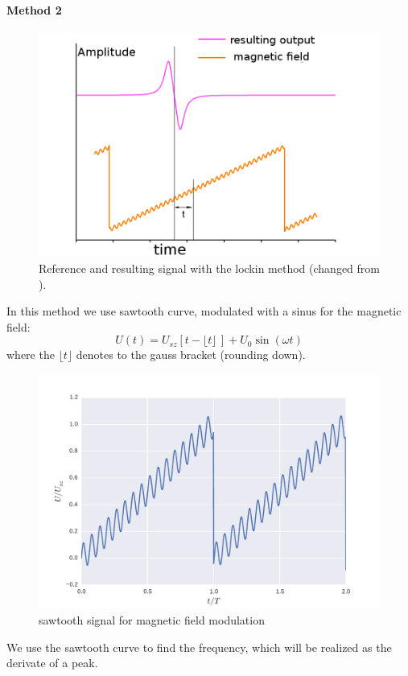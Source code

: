 \paragraph{Method 2} 
\begin{figure}[htpb]
    \centering
    \includegraphics[width=0.8\linewidth]{figures/lockin2}
    \caption{Reference and resulting signal with the lockin method
        (changed from \cite{versuchsanleitung}).}
    \label{fig:lockin2}
\end{figure}
In this method we use sawtooth curve, modulated
with a sinus for the magnetic field:
\begin{equation}
   U(t) = U_{sz} \left[ t - \lfloor t \rfloor \,  \right] + U_0 \sin(\omega t)
\end{equation}
where the $\lfloor t \rfloor$ denotes to the gauss bracket (rounding down). 
\begin{figure}[htpb]
    \centering
    \includegraphics[width=0.8\linewidth]{figures/sawtooth}
    \caption{sawtooth signal for magnetic field modulation}
    \label{fig:sawtooth}
\end{figure}
We use the sawtooth curve to find the frequency, which will be 
realized as the derivate of a peak.
